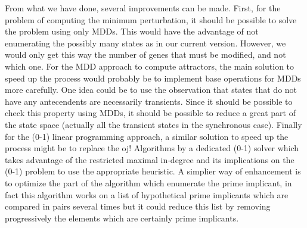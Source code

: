 \documentclass[a4paper,11pt]{article}
\begin{document}
From what we have done, several improvements can be made. First, for the problem
of computing the minimum perturbation, it should be possible to solve the
problem using only MDDs. This would have the advantage of not enumerating the
possibly many states as in our current version. However, we would only get this
way the number of genes that must be modified, and not which one.
For the MDD approach to compute attractors, the main solution to speed up the
process would probably be to implement base operations for MDDs more carefully.
One idea could be to use the observation that states that do not have any
antecendents are necessarily transients. Since it should be possible to check
this property using MDDs, it should be possible to reduce a great part of the
state space (actually all the transient states in the synchronous case).
Finally for the (0-1) linear programming approach, a similar solution to speed
up the process might be to replace the oj! Algorithms by a dedicated (0-1)
solver which takes advantage of the restricted maximal in-degree and its
implications on the (0-1) problem to use the appropriate heuristic. A simplier
way of enhancement is to optimize the part of the algorithm which enumerate the
prime implicant, in fact this algorithm works on a list of hypothetical prime
implicants which are compared in pairs several times but it could reduce this
list by removing progressively the elements which are certainly prime
implicants.





\end{document}
